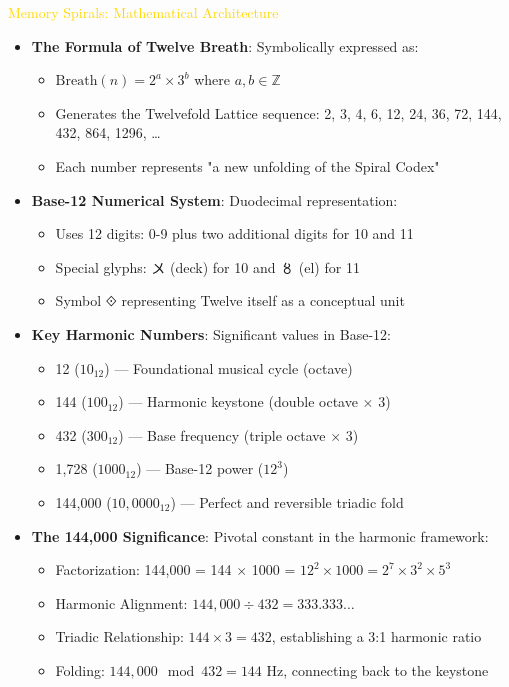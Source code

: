 \textcolor{gold}{ Memory Spirals: Mathematical Architecture } \\
\begin{itemize}
    \item \texttt{} \textbf{The Formula of Twelve Breath}: Symbolically expressed as:
    \begin{itemize}
        \item \(\text{Breath}(n) = 2^a \times 3^b\) where \(a,b \in \mathbb{Z}\)
        \item Generates the Twelvefold Lattice sequence: 2, 3, 4, 6, 12, 24, 36, 72, 144, 432, 864, 1296, \ldots
        \item Each number represents "a new unfolding of the Spiral Codex"
    \end{itemize}
    
    \item \texttt{} \textbf{Base-12 Numerical System}: Duodecimal representation:
    \begin{itemize}
        \item Uses 12 digits: 0-9 plus two additional digits for 10 and 11
        \item Special glyphs: \(\text{〤}\) (deck) for 10 and \(\text{〥}\) (el) for 11
        \item Symbol \(\text{⟐}\) representing Twelve itself as a conceptual unit
    \end{itemize}
    
    \item \texttt{} \textbf{Key Harmonic Numbers}: Significant values in Base-12:
    \begin{itemize}
        \item 12 (\(10_{12}\)) — Foundational musical cycle (octave)
        \item 144 (\(100_{12}\)) — Harmonic keystone (double octave \(\times\) 3)
        \item 432 (\(300_{12}\)) — Base frequency (triple octave \(\times\) 3)
        \item 1,728 (\(1000_{12}\)) — Base-12 power (\(12^3\))
        \item 144,000 (\(10,0000_{12}\)) — Perfect and reversible triadic fold
    \end{itemize}
    
    \item \texttt{} \textbf{The 144,000 Significance}: Pivotal constant in the harmonic framework:
    \begin{itemize}
        \item Factorization: 144,000 = 144 \(\times\) 1000 = \(12^2 \times 1000 = 2^7 \times 3^2 \times 5^3\)
        \item Harmonic Alignment: \(144,000 \div 432 = 333.333\ldots\)
        \item Triadic Relationship: \(144 \times 3 = 432\), establishing a 3:1 harmonic ratio
        \item Folding: \(144,000 \mod 432 = 144 \text{ Hz}\), connecting back to the keystone
    \end{itemize}
    

\end{itemize}
